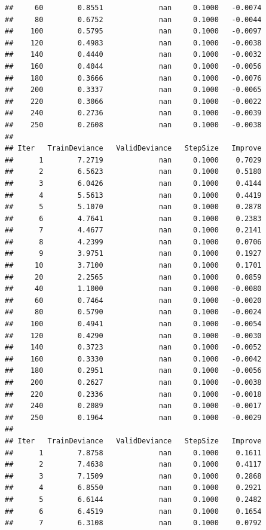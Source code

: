 \documentclass[
]{book}
\begin{document}
\begin{verbatim}
##     60        0.8551             nan     0.1000   -0.0074
##     80        0.6752             nan     0.1000   -0.0044
##    100        0.5795             nan     0.1000   -0.0097
##    120        0.4983             nan     0.1000   -0.0038
##    140        0.4440             nan     0.1000   -0.0032
##    160        0.4044             nan     0.1000   -0.0056
##    180        0.3666             nan     0.1000   -0.0076
##    200        0.3337             nan     0.1000   -0.0065
##    220        0.3066             nan     0.1000   -0.0022
##    240        0.2736             nan     0.1000   -0.0039
##    250        0.2608             nan     0.1000   -0.0038
## 
## Iter   TrainDeviance   ValidDeviance   StepSize   Improve
##      1        7.2719             nan     0.1000    0.7029
##      2        6.5623             nan     0.1000    0.5180
##      3        6.0426             nan     0.1000    0.4144
##      4        5.5613             nan     0.1000    0.4419
##      5        5.1070             nan     0.1000    0.2878
##      6        4.7641             nan     0.1000    0.2383
##      7        4.4677             nan     0.1000    0.2141
##      8        4.2399             nan     0.1000    0.0706
##      9        3.9751             nan     0.1000    0.1927
##     10        3.7100             nan     0.1000    0.1701
##     20        2.2565             nan     0.1000    0.0859
##     40        1.1000             nan     0.1000   -0.0080
##     60        0.7464             nan     0.1000   -0.0020
##     80        0.5790             nan     0.1000   -0.0024
##    100        0.4941             nan     0.1000   -0.0054
##    120        0.4290             nan     0.1000   -0.0030
##    140        0.3723             nan     0.1000   -0.0052
##    160        0.3330             nan     0.1000   -0.0042
##    180        0.2951             nan     0.1000   -0.0056
##    200        0.2627             nan     0.1000   -0.0038
##    220        0.2336             nan     0.1000   -0.0018
##    240        0.2089             nan     0.1000   -0.0017
##    250        0.1964             nan     0.1000   -0.0029
## 
## Iter   TrainDeviance   ValidDeviance   StepSize   Improve
##      1        7.8758             nan     0.1000    0.1611
##      2        7.4638             nan     0.1000    0.4117
##      3        7.1509             nan     0.1000    0.2868
##      4        6.8550             nan     0.1000    0.2921
##      5        6.6144             nan     0.1000    0.2482
##      6        6.4519             nan     0.1000    0.1654
##      7        6.3108             nan     0.1000    0.0792

\end{verbatim}
\end{document}
